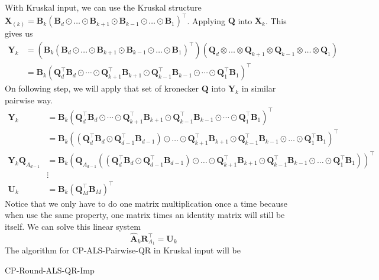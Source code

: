 \documentclass{article}
\newcommand{\mat}[1]{\mathbf{#1}}
\begin{document}
With Kruskal input, we can use the Kruskal structure $\mat{X}_{(k)} = \mat{B}_{k}(\mat{B}_{d} \odot \dots \odot \mat{B}_{k+1} \odot \mat{B}_{k-1}  \odot \dots \odot \mat{B}_{1})^\top$. 
Applying $\mat{Q}$ into $\mat{X}_k$. 
This gives us
\begin{align}
  \mat{Y}_k &= (\mat{B}_{k}(\mat{B}_{d} \odot \dots \odot \mat{B}_{k+1} \odot \mat{B}_{k-1}  \odot \dots \odot \mat{B}_{1})^\top)(\mat{Q}_d \otimes \dots \otimes \mat{Q}_{k+1} \otimes \mat{Q}_{k-1} \otimes \dots \otimes \mat{Q}_1) \nonumber \\
  &= \mat{B}_k(\mat{Q}_d^\top\mat{B}_d \odot \cdots \odot \mat{Q}_{k+1}^\top\mat{B}_{k+1} \odot \mat{Q}_{k-1}^\top\mat{B}_{k-1} \odot \cdots \odot \mat{Q}_1^\top\mat{B}_1)^\top \nonumber
\end{align}
On following step, we will apply that set of kronecker $\mat{Q}$ into $\mat{Y}_k$ in similar pairwise way.
\begin{align}
  \mat{Y}_k &= \mat{B}_k(\mat{Q}_d^\top\mat{B}_d \odot \cdots \odot \mat{Q}_{k+1}^\top\mat{B}_{k+1} \odot \mat{Q}_{k-1}^\top\mat{B}_{k-1} \odot \cdots \odot \mat{Q}_1^\top\mat{B}_1)^\top \nonumber \\
      &= \mat{B}_k((\mat{Q}_d^\top\mat{B}_d \odot \mat{Q}_{d-1}^\top\mat{B}_{d-1}) \odot \dots \odot \mat{Q}_{k+1}^\top\mat{B}_{k+1}\odot \mat{Q}_{k-1}^\top\mat{B}_{k-1} \odot \dots \odot \mat{Q}_{1}^\top\mat{B}_{1})^\top \nonumber      \\
      \mat{Y}_k\mat{Q}_{A_{d-1}}  &= \mat{B}_k(\mat{Q}_{A_{d-1}}((\mat{Q}_d^\top\mat{B}_d \odot \mat{Q}_{d-1}^\top\mat{B}_{d-1}) \odot \dots \odot \mat{Q}_{k+1}^\top\mat{B}_{k+1}\odot \mat{Q}_{k-1}^\top\mat{B}_{k-1} \odot \dots \odot \mat{Q}_{1}^\top\mat{B}_{1}))^\top \nonumber      \\
      & \vdots \nonumber \\
    \mat{U}_k  &= \mat{B}_k(\mat{Q}_M^\top\mat{B}_M)^\top \nonumber  
\end{align}
Notice that we only have to do one matrix multiplication once a time because when use the same property, one matrix times an identity matrix will still be itself.
We can solve this linear system
\begin{equation}
  \mat{\hat{A}}_k\mat{R}_{A_1}^\top = \mat{U}_k 
\end{equation}
The algorithm for CP-ALS-Pairwise-QR in Kruskal input will be
\begin{algorithm}
  \caption{CP-Round-ALS-QR-Imp}
  \label{alg:cp-als-pairwise-qr-kruskal}
  
\end{algorithm}
\end{document}
